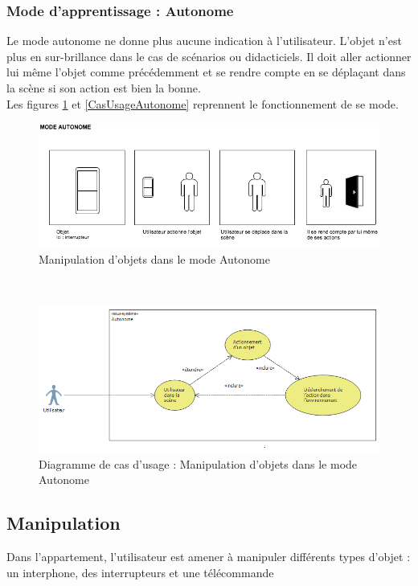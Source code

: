 \subsubsection{Mode d'apprentissage : Autonome}

Le mode autonome ne donne plus aucune indication à l'utilisateur. L'objet n'est plus en sur-brillance dans le cas de scénarios ou didacticiels. Il doit aller actionner lui même l'objet comme précédemment et se rendre compte en se déplaçant dans la scène si son action est bien la bonne. 
\\
Les figures \ref{fig:MaquetteAutonome} et \ref{CasUsageAutonome}  reprennent le fonctionnement de se mode.

\begin{figure}[h]
\centering
\includegraphics[width=1\textwidth]{img-utilisateur/autonome.png}
\caption{\label{fig:MaquetteAutonome} Manipulation d'objets dans le mode Autonome }
\end{figure}
\\
\begin{figure}[h]
\centering
\includegraphics[width=1\textwidth]{img-utilisateur/cas-usage-autonome.png}
\caption{\label{fig:CasUsageAutonome} Diagramme de cas d'usage : Manipulation d'objets dans le mode Autonome }
\end{figure}
\FloatBarrier 



\subsection{Manipulation}
Dans l’appartement, l’utilisateur est amener à manipuler différents types d’objet : un interphone, des interrupteurs et une télécommande

